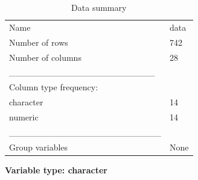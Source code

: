 \documentclass[
]{article}
\begin{document}
\begin{longtable}[]{@{}ll@{}}
\caption{Data summary}\tabularnewline
\toprule\noalign{}
\endfirsthead
\endhead
\bottomrule\noalign{}
\endlastfoot
Name & data \\
Number of rows & 742 \\
Number of columns & 28 \\
\_\_\_\_\_\_\_\_\_\_\_\_\_\_\_\_\_\_\_\_\_\_\_ & \\
Column type frequency: & \\
character & 14 \\
numeric & 14 \\
\_\_\_\_\_\_\_\_\_\_\_\_\_\_\_\_\_\_\_\_\_\_\_\_ & \\
Group variables & None \\
\end{longtable}

\textbf{Variable type: character}
\end{document}
